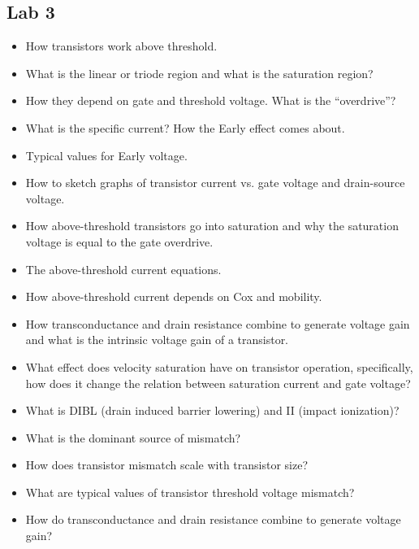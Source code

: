 \documentclass[main]{subfiles}
\begin{document}
\subsection{Lab 3}
\begin{itemize}
\item How transistors work above threshold. 
\item What is the linear or triode region and what is the saturation region? 
\item How they depend on gate and threshold voltage. What is the “overdrive”? 
\item What is the specific current? How the Early effect comes about. 
\item Typical values for Early voltage. 
\item How to sketch graphs of transistor current vs. gate voltage and drain-source voltage. 
\item How above-threshold transistors go into saturation and why the saturation voltage is equal to the gate overdrive. 
\item The above-threshold current equations. 
\item How above-threshold current depends on Cox and mobility.
\item How transconductance and drain resistance combine to generate voltage gain and what is the intrinsic voltage gain of a transistor.
\item What effect does velocity saturation have on transistor operation, specifically, how does it change the relation between saturation current and gate voltage? 
\item What is DIBL (drain induced barrier lowering) and II (impact ionization)?
\item What is the dominant source of mismatch? 
\item How does transistor mismatch scale with transistor size? 
\item What are typical values of transistor threshold voltage mismatch?
\item How do transconductance and drain resistance combine to generate voltage gain?
\end{itemize}
\end{document}
